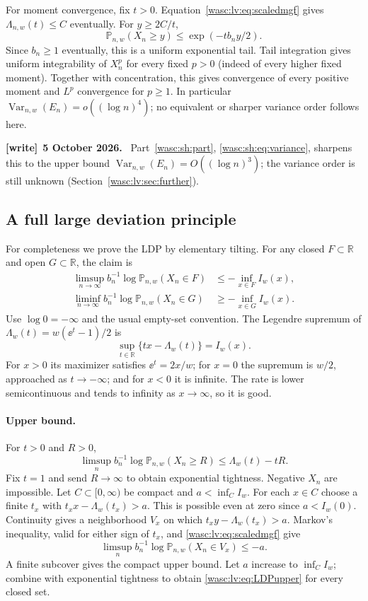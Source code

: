 \documentclass[11pt,a4paper]{article}
\theoremstyle{remark}\newtheorem{remark}[theorem]{Remark}
\newcommand{\R}{\mathbb R}\newcommand{\Q}{\mathbb Q}\newcommand{\E}{\mathbb E}\newcommand{\Prob}{\mathbb P}
\numberwithin{equation}{section}
\newenvironment{writenote}[1][]{\par\smallskip\begingroup\small
 \noindent\textbf{[write]}\if\relax\detokenize{#1}\relax\else~\textbf{#1.}\fi\ }%
 {\par\endgroup\smallskip}
\begin{document}
For moment convergence, fix $t>0$. Equation~\eqref{wasc:lv:eq:scaledmgf} gives
$\Lambda_{n,w}(t)\le C$ eventually. For $y\ge2C/t$,
\begin{equation}\label{wasc:lv:eq:tailUI}
\Prob_{n,w}(X_n\ge y)\le\exp(-tb_n y/2).
\end{equation}
Since $b_n\ge1$ eventually, this is a uniform exponential tail. Tail integration gives uniform integrability of $X_n^p$ for every fixed $p>0$ (indeed of every higher fixed moment). Together with concentration, this gives convergence of every positive moment and $L^p$ convergence for $p\ge1$.
In particular $\operatorname{Var}_{n,w}(E_n)=o((\log n)^4)$; no equivalent or sharper variance order follows here.
\begin{writenote}[5 October 2026]
Part~\ref{wasc:sh:part}, \eqref{wasc:sh:eq:variance}, sharpens this to the upper bound $\operatorname{Var}_{n,w}(E_n)=O((\log n)^3)$; the variance order is still unknown (Section~\ref{wasc:lv:sec:further}).
\end{writenote}

\subsection{A full large deviation principle}
For completeness we prove the LDP by elementary tilting. For any closed $F\subset\R$ and open $G\subset\R$, the claim is
\begin{align}
\limsup_{n\to\infty}b_n^{-1}\log\Prob_{n,w}(X_n\in F)
&\le-\inf_{x\in F}I_w(x),\label{wasc:lv:eq:LDPupper}\\
\liminf_{n\to\infty}b_n^{-1}\log\Prob_{n,w}(X_n\in G)
&\ge-\inf_{x\in G}I_w(x).\label{wasc:lv:eq:LDPlower}
\end{align}
Use $\log0=-\infty$ and the usual empty-set convention.
The Legendre supremum of $\Lambda_w(t)=w(\ee^t-1)/2$ is
\[
\sup_{t\in\R}\{tx-\Lambda_w(t)\}=I_w(x).
\]
For $x>0$ its maximizer satisfies $\ee^t=2x/w$; for $x=0$ the supremum is $w/2$, approached as $t\to-\infty$; and for $x<0$ it is infinite. The rate is lower semicontinuous and tends to infinity as $x\to\infty$, so it is good.

\paragraph{Upper bound.}
For $t>0$ and $R>0$,
\[
\limsup_n b_n^{-1}\log\Prob_{n,w}(X_n\ge R)\le\Lambda_w(t)-tR.
\]
Fix $t=1$ and send $R\to\infty$ to obtain exponential tightness. Negative $X_n$ are impossible.
Let $C\subset[0,\infty)$ be compact and $a<\inf_C I_w$. For each $x\in C$ choose a finite $t_x$ with $t_xx-\Lambda_w(t_x)>a$. This is possible even at zero since $a<I_w(0)$.
Continuity gives a neighborhood $V_x$ on which $t_xy-\Lambda_w(t_x)>a$.
Markov's inequality, valid for either sign of $t_x$, and \eqref{wasc:lv:eq:scaledmgf} give
\[
\limsup_n b_n^{-1}\log\Prob_{n,w}(X_n\in V_x)\le-a.
\]
A finite subcover gives the compact upper bound. Let $a$ increase to $\inf_C I_w$; combine with exponential tightness to obtain \eqref{wasc:lv:eq:LDPupper} for every closed set.
\end{document}
